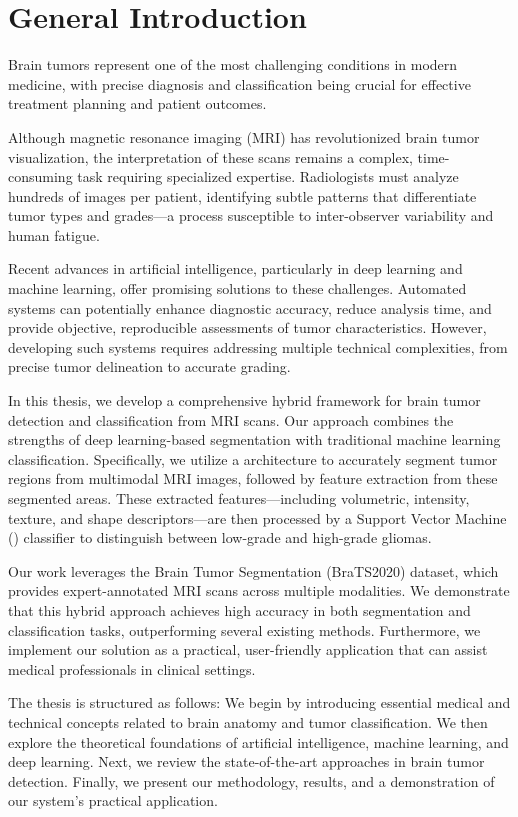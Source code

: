 \chapter*{General Introduction}

Brain tumors represent one of the most challenging conditions in modern medicine, with precise diagnosis and classification being crucial for effective treatment planning and patient outcomes.

Although magnetic resonance imaging (MRI) has revolutionized brain tumor visualization, the interpretation of these scans remains a complex, time-consuming task requiring specialized expertise. Radiologists must analyze hundreds of images per patient, identifying subtle patterns that differentiate tumor types and grades—a process susceptible to inter-observer variability and human fatigue.

Recent advances in artificial intelligence, particularly in deep learning and machine learning, offer promising solutions to these challenges. Automated systems can potentially enhance diagnostic accuracy, reduce analysis time, and provide objective, reproducible assessments of tumor characteristics. However, developing such systems requires addressing multiple technical complexities, from precise tumor delineation to accurate grading.

In this thesis, we develop a comprehensive hybrid framework for brain tumor detection and classification from MRI scans. Our approach combines the strengths of deep learning-based segmentation with traditional machine learning classification. Specifically, we utilize a  architecture to accurately segment tumor regions from multimodal MRI images, followed by feature extraction from these segmented areas. These extracted features—including volumetric, intensity, texture, and shape descriptors—are then processed by a Support Vector Machine () classifier to distinguish between low-grade and high-grade gliomas.

Our work leverages the Brain Tumor Segmentation (BraTS2020) dataset, which provides expert-annotated MRI scans across multiple modalities. We demonstrate that this hybrid approach achieves high accuracy in both segmentation and classification tasks, outperforming several existing methods. Furthermore, we implement our solution as a practical, user-friendly application that can assist medical professionals in clinical settings.

The thesis is structured as follows: We begin by introducing essential medical and technical concepts related to brain anatomy and tumor classification. We then explore the theoretical foundations of artificial intelligence, machine learning, and deep learning. Next, we review the state-of-the-art approaches in brain tumor detection. Finally, we present our methodology, results, and a demonstration of our system's practical application.
